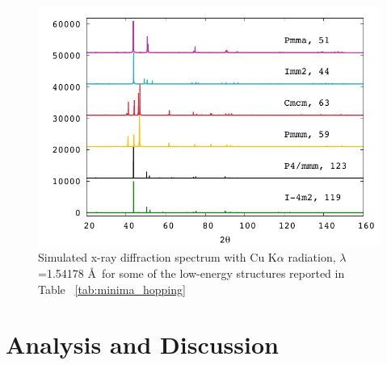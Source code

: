 \documentclass[%
preprint,
 amsmath,amssymb,
 aps,
prb,
showkeys,
]{revtex4-1}
\begin{document}
\begin{figure}[htp!]
  \includegraphics[scale=0.9]{figure_3}
  \caption{Simulated x-ray diffraction spectrum with Cu K$\alpha$ radiation, $\lambda$=1.54178 \AA \  for some of the low-energy structures reported in Table~ \ref{tab:minima_hopping}} 
  \label{fig:xrd}
\end{figure}
\section{Analysis and Discussion}
\label{Sec:analysis}
\end{document}
